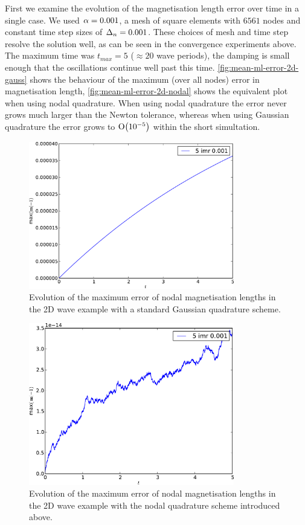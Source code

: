 First we examine the evolution of the magnetisation length error over time in a single case.
We used $\alpha = 0.001$, a mesh of square elements with $6561$ nodes and constant time step sizes of $\Delta_{n} = 0.001$. 
These choices of mesh and time step resolve the solution well, as can be seen in the convergence experiments above.
The maximum time was $t_{max} = 5$ ($\approx 20$ wave periods), the damping is small enough that the oscillations continue well past this time. %
\autoref{fig:mean-ml-error-2d-gauss} shows the behaviour of the maximum (over all nodes) error in magnetisation length, \autoref{fig:mean-ml-error-2d-nodal} shows the equivalent plot when using nodal quadrature.
When using nodal quadrature the error never grows much larger than the Newton tolerance, whereas when using Gaussian quadrature the error grows to $\text{O}{\left( 10^{-5} \right)}$ within the short simultation.

\begin{figure}
  \centering
  \includegraphics[width=0.8\textwidth]{plots/2d_wave_solution_m_length/gauss-maxmathbfm-1vst.pdf}
  \caption{Evolution of the maximum error of nodal magnetisation lengths in the 2D wave example with a standard Gaussian quadrature scheme.}
  \label{fig:mean-ml-error-2d-gauss}
\end{figure}

\begin{figure}
  \centering
  \includegraphics[width=0.8\textwidth]{plots/2d_wave_solution_m_length/lnodal-maxmathbfm-1vst.pdf}
  \caption{Evolution of the maximum error of nodal magnetisation lengths in the 2D wave example with the nodal quadrature scheme introduced above.}
  \label{fig:mean-ml-error-2d-nodal}
\end{figure}

